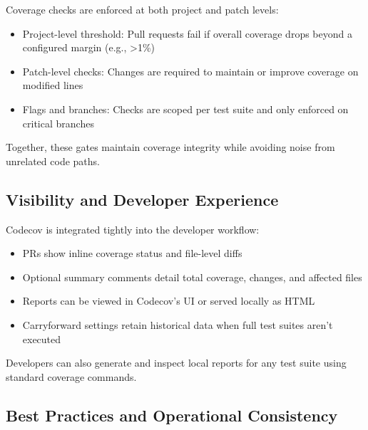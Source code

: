 Coverage checks are enforced at both project and patch levels:

\begin{itemize}
  \item Project-level threshold: Pull requests fail if overall coverage
    drops beyond a configured margin (e.g., \textgreater1\%)

  \item Patch-level checks: Changes are required to maintain or improve
    coverage on modified lines

  \item Flags and branches: Checks are scoped per test suite and only
    enforced on critical branches
\end{itemize}

Together, these gates maintain coverage integrity while avoiding noise from
unrelated code paths.

\subsection{Visibility and Developer Experience}

Codecov is integrated tightly into the developer workflow:

\begin{itemize}
  \item PRs show inline coverage status and file-level diffs

  \item Optional summary comments detail total coverage, changes, and affected
    files

  \item Reports can be viewed in Codecov's UI or served locally as HTML

  \item Carryforward settings retain historical data when full test suites
    aren't executed
\end{itemize}

Developers can also generate and inspect local reports for any test suite
using standard coverage commands.

\subsection{Best Practices and Operational Consistency}

